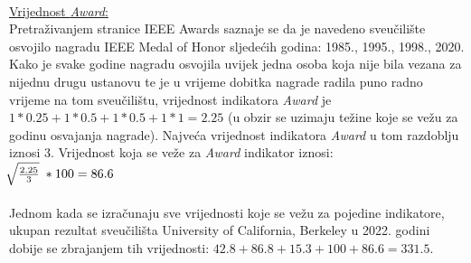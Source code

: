 \documentclass[times, utf8, zavrsni]{fer}
\begin{document}
\\ \underline{Vrijednost \emph{Award}:} 
\\ Pretraživanjem stranice IEEE Awards saznaje se da je navedeno sveučilište osvojilo nagradu IEEE Medal of Honor sljedećih godina: 1985., 1995., 1998., 2020. Kako je 
svake godine nagradu osvojila uvijek jedna osoba koja nije bila vezana za nijednu drugu ustanovu te je u vrijeme dobitka nagrade
radila puno radno vrijeme na tom sveučilištu, vrijednost 
indikatora \emph{Award} je $1*0.25+1*0.5+1*0.5+1*1 = 2.25$ (u obzir se uzimaju težine koje se vežu za godinu osvajanja nagrade). Najveća vrijednost 
indikatora \emph{Award} u tom razdoblju iznosi 3. Vrijednost koja se veže za \emph{Award} indikator iznosi: \; \\ $\sqrt[\leftroot{-2}]{\frac{2.25}{3}} \; * 100 = 86.6$
\\\\Jednom kada se izračunaju sve vrijednosti koje se vežu za pojedine indikatore,
ukupan rezultat sveučilišta University of California, Berkeley u 2022. godini dobije se zbrajanjem tih vrijednosti: $42.8+86.8+15.3+100+86.6 = 331.5$.
\end{document}
